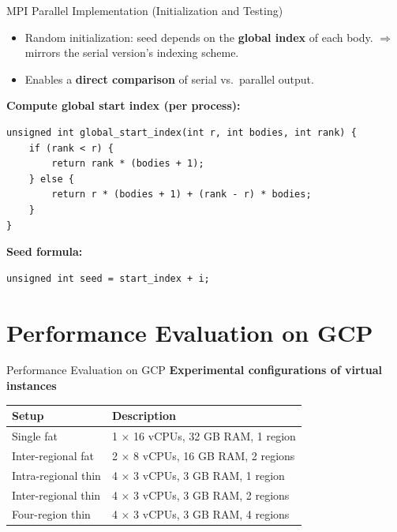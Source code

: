 \documentclass{beamer}
\begin{document}
\begin{frame}[fragile]{MPI Parallel Implementation (Initialization and Testing)}
\begin{itemize}
  \item Random initialization: seed depends on the \textbf{global index} of each body.  
        $\Rightarrow$ mirrors the serial version’s indexing scheme.
  \item Enables a \textbf{direct comparison} of serial vs.\ parallel output.
\end{itemize}

\vspace{2mm}

\textbf{Compute global start index (per process):}
\begin{lstlisting}[style=nbody]
unsigned int global_start_index(int r, int bodies, int rank) {
    if (rank < r) {
        return rank * (bodies + 1);
    } else {
        return r * (bodies + 1) + (rank - r) * bodies;
    }
}
\end{lstlisting}

\textbf{Seed formula:}
\begin{lstlisting}[style=nbody]
unsigned int seed = start_index + i;
\end{lstlisting}
\end{frame}

\section{Performance Evaluation on GCP}
\begin{frame}{Performance Evaluation on GCP}
\centering
\textbf{Experimental configurations of virtual instances}
\vspace{0.4cm}

\begin{tabular}{l l}
\toprule
\textbf{Setup} & \textbf{Description} \\
\midrule
Single fat & 1 × 16 vCPUs, 32 GB RAM, 1 region \\
Inter-regional fat & 2 × 8 vCPUs, 16 GB RAM, 2 regions \\
Intra-regional thin & 4 × 3 vCPUs, 3 GB RAM, 1 region \\
Inter-regional thin & 4 × 3 vCPUs, 3 GB RAM, 2 regions \\
Four-region thin & 4 × 3 vCPUs, 3 GB RAM, 4 regions \\
\bottomrule
\end{tabular}
\end{frame}
\end{document}
